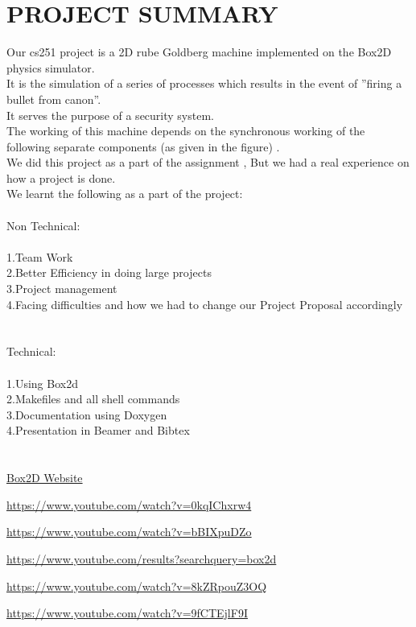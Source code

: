 \documentclass[a4paper, 11pt]{article}
\begin{document}
\section*{\large{PROJECT SUMMARY}}
\large{
Our cs251 project is a 2D rube Goldberg machine implemented on the Box2D physics simulator.\\
 It is the simulation of a series of processes which results in the event of ”firing a bullet from canon”.\\
It serves the purpose of a security system.\\
 The working of this machine depends on the synchronous working of the following separate components (as given in the figure) .\\

\large{
We did this project as a part of the assignment , But we had a real experience on how a project is done.\\
We learnt  the following as a part of the project: \\
\\
{\huge Non Technical:}\\
\\
1.Team Work\\
2.Better Efficiency in doing large projects\\
3.Project management\\
4.Facing difficulties  and how we had to change our Project Proposal accordingly\\
\\
\\
{\huge Technical:}\\
\\
1.Using Box2d \\
2.Makefiles and all shell commands \\
3.Documentation using Doxygen\\
4.Presentation in Beamer and Bibtex\\
}
}
\clearpage
\section*{}
\hfill
\begin{thebibliography}{7}

\href{''http://box2d.org/''}{Box2D Website}

\href{''https://www.youtube.com/watch?v=0kqIChxrw-4''}{https://www.youtube.com/watch?v=0kqIChxrw4}

\href{''https://www.youtube.com/watch?v=bBIXpu-D_Zo''}{https://www.youtube.com/watch?v=bBIXpuDZo}

\href{''https://www.youtube.com/results?search_query=box2d''}{https://www.youtube.com/results?searchquery=box2d}
 
\href{''https://www.youtube.com/watch?v=8kZRpouZ3OQ''}{https://www.youtube.com/watch?v=8kZRpouZ3OQ}

\href{''https://www.youtube.com/watch?v=9fCT-EjlF9I''}{https://www.youtube.com/watch?v=9fCTEjlF9I}

\end{thebibliography}
\clearpage
\end{document}
